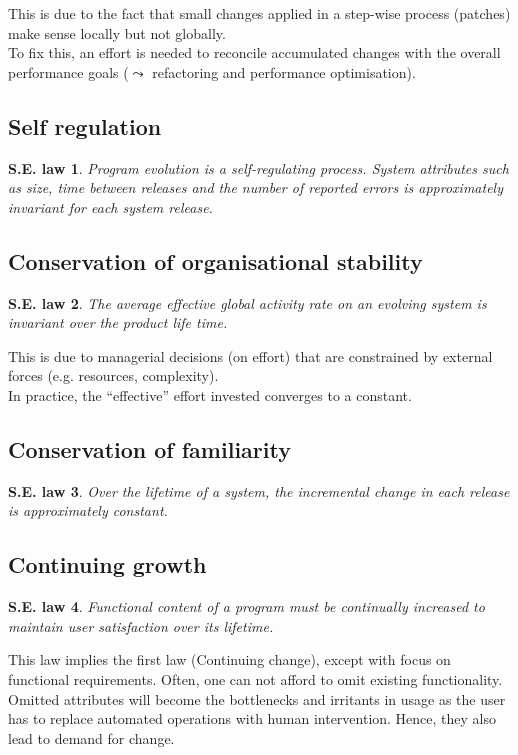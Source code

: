 \documentclass[a4paper,11pt]{report}
\newtheorem{law}{S.E. law}
\begin{document}
This is due to the fact that small changes applied in a step-wise process
(patches) make sense locally but not globally.\\

To fix this, an effort is needed to reconcile accumulated changes with the
overall performance goals ($\leadsto$ refactoring and performance optimisation).

\subsection{Self regulation}
\begin{law}
Program evolution is a self-regulating process. System attributes such as
size, time between releases and the number of reported errors is approximately
invariant for each system release.
\end{law}

\subsection{Conservation of organisational stability}
\begin{law}
The average effective global activity rate on an evolving system is
invariant over the product life time.
\end{law}

This is due to managerial decisions (on effort) that are constrained by external
forces (e.g. resources, complexity).\\

In practice, the ``effective'' effort invested converges to a constant.

\subsection{Conservation of familiarity}
\begin{law}
Over the lifetime of a system, the incremental change in each release is
approximately constant.
\end{law}

\subsection{Continuing growth}
\begin{law}
Functional content of a program must be continually increased to maintain
user satisfaction over its lifetime.
\end{law}

This law implies the first law (Continuing change), except with focus on
functional requirements. Often, one can not afford to omit existing
functionality. Omitted attributes will become the bottlenecks and irritants in
usage as the user has to replace automated operations with human intervention.
Hence, they also lead to demand for change.
\end{document}
